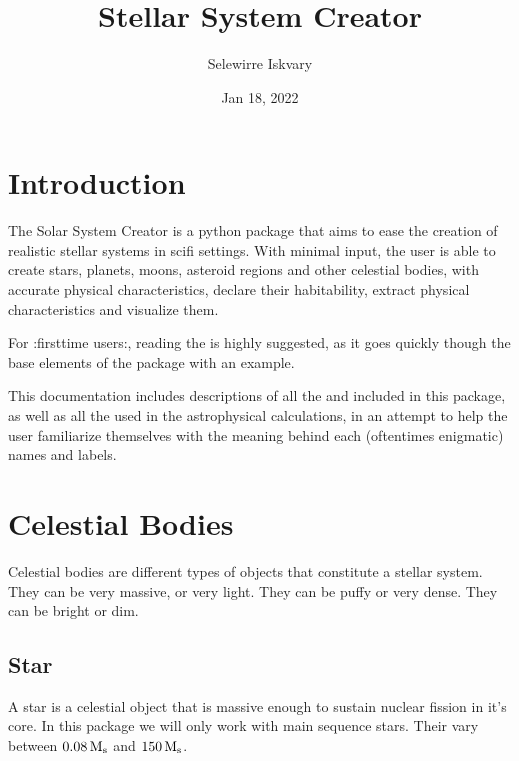 \documentclass[letterpaper,10pt,english]{sphinxmanual}
\title{Stellar System Creator}
\date{Jan 18, 2022}
\author{Selewirre Iskvary}
\begin{document}
\pagestyle{empty}
\sphinxmaketitle
\pagestyle{plain}
\sphinxtableofcontents
\pagestyle{normal}
\label{\detokenize{index::doc}}



\chapter{Introduction}
\label{\detokenize{introduction:introduction}}\label{\detokenize{introduction::doc}}
\sphinxAtStartPar
The Solar System Creator is a python package that aims to ease the creation of realistic
stellar systems in sci\sphinxhyphen{}fi settings. With minimal input, the user is able to create stars, planets,
moons, asteroid regions and other celestial bodies, with accurate physical characteristics, declare their habitability,
extract physical characteristics and visualize them.

\sphinxAtStartPar
For :first\sphinxhyphen{}time users:, reading the {\hyperref[\detokenize{gui/gui:id1}]{}} is highly suggested,
as it goes quickly though the base elements of the package with an example.

\sphinxAtStartPar
This documentation includes descriptions of all the {\hyperref[\detokenize{celestial_bodies/celestial_bodies:id1}]{}}
and {\hyperref[\detokenize{celestial_systems/celestial_systems:id1}]{}} included in this package, as well as all the
{\hyperref[\detokenize{quantities/quantities:id1}]{}} used in the astrophysical calculations, in an attempt to help
the user familiarize themselves with the meaning behind each (oftentimes enigmatic) names and labels.


\chapter{Celestial Bodies}
\label{\detokenize{celestial_bodies/celestial_bodies:celestial-bodies}}\label{\detokenize{celestial_bodies/celestial_bodies::doc}}\label{\detokenize{celestial_bodies/celestial_bodies:id1}}
\sphinxAtStartPar
Celestial bodies are different types of objects that constitute a stellar system.
They can be very massive, or very light. They can be puffy or very dense.
They can be bright or dim.


\section{Star}
\label{\detokenize{celestial_bodies/star:star}}\label{\detokenize{celestial_bodies/star::doc}}\label{\detokenize{celestial_bodies/star:id1}}
\sphinxAtStartPar
A star is a celestial object that is massive enough to sustain nuclear fission in it’s core.
In this package we will only work with main sequence stars.
Their {\hyperref[\detokenize{quantities/material/mass:id1}]{}} vary between \(0.08 \, {\rm M_s}\) and \(150 \, {\rm M_s}\).
\end{document}
